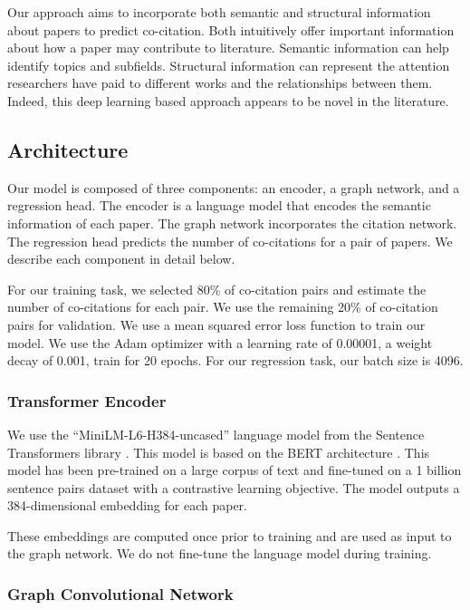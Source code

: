 \documentclass[10pt,twocolumn,letterpaper]{article}
\begin{document}
Our approach aims to incorporate both semantic and structural information about papers to predict co-citation. Both intuitively offer important information about how a paper may contribute to literature. Semantic information can help identify topics and subfields. Structural information can represent the attention researchers have paid to different works and the relationships between them. Indeed, this deep learning based approach appears to be novel in the literature. 

\subsection{Architecture}

Our model is composed of three components: an encoder, a graph network, and a regression head. 
The encoder is a language model that encodes the semantic information of each paper. The graph network incorporates the citation network. The regression head predicts the number of co-citations for a pair of papers. We describe each component in detail below.

For our training task, we selected 80\% of co-citation pairs and estimate the number of co-citations for each pair. We use the remaining 20\% of co-citation pairs for validation. 
We use a mean squared error loss function to train our model.
We use the Adam optimizer with a learning rate of 0.00001, a weight decay of 0.001, train for 20 epochs. For our regression task, our batch size is 4096.

\subsubsection{Transformer Encoder}

We use the ``MiniLM-L6-H384-uncased'' language model from the Sentence Transformers library \cite{reimers2019sentence}. This model is based on the BERT architecture \cite{devlin2018bert}. This model has been pre-trained on a large corpus of text and fine-tuned on a 1 billion sentence pairs dataset with a contrastive learning objective. The model outputs a 384-dimensional embedding for each paper.

These embeddings are computed once prior to training and are used as input to the graph network. We do not fine-tune the language model during training.

\subsubsection{Graph Convolutional Network}
\end{document}

